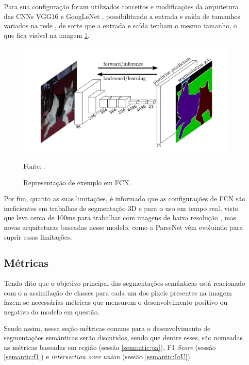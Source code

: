 Para sua configuração foram utilizados conceitos e modificações da arquitetura das CNNs VGG16 \cite{Simonyan2015VeryRecognition} e GoogLeNet \cite{Szegedy2015GoingConvolutions}, possibilitando a entrada e saída de tamanhos variados na rede \cite{Minaee2021}, de sorte que a entrada e saída tenham o mesmo tamanho, o que fica visível na imagem \ref{semantic:fig:6}.

\begin{figure}[H]
    \centering
    \caption{Representação de exemplo em FCN.}
    \includegraphics[width=1\linewidth]{recursos/imagens/semantic/fcn_example.png}
    \label{semantic:fig:6}

    \vspace*{1 cm}
    Fonte: \cite{Shelhamer2016}.
\end{figure}

Por fim, quanto as suas limitações, é informado que as configurações de FCN são ineficientes em trabalhos de segmentação 3D e para o uso em tempo real, visto que leva cerca de 100ms para trabalhar com imagens de baixa resolução \cite{Minaee2021}, mas novas arquiteturas baseadas nesse modelo, como a ParseNet \cite{Liu2015ParseNet:Better} vêm evoluindo para suprir essas limitações.


\subsection{Métricas}
\label{semantic:metrics}

Tendo dito que o objetivo principal das segmentações semânticas está reacionado com o a assimilação de classes para cada um dos pixeis presentes na imagem \cite{Csurka} fazem-se necessárias métricas que mensurem o desenvolvimento positivo ou negativo do modelo em questão.

Sendo assim, nessa seção métricas comuns para o desenvolvimento de segmentações semânticas serão discutidos, sendo que dentre esses, são nomeadas as métricas baseadas em região (sessão \ref{semantic:pa}), F1 \textit{Score} (sessão \ref{semantic:f1}) e \textit{intersection over union} (sessão \ref{semantic:IoU}).


